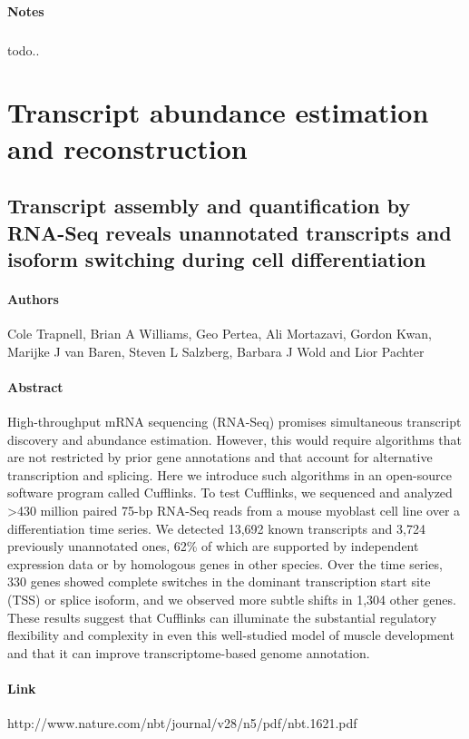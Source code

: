\documentclass{article}
\begin{document}
			\paragraph{Notes}
				\subparagraph{} todo..
	\section{Transcript abundance estimation and reconstruction}
		\subsection{Transcript assembly and quantification by RNA-Seq reveals unannotated transcripts and isoform switching during cell differentiation}
		\paragraph{Authors\\} Cole Trapnell, Brian A Williams, Geo Pertea, Ali Mortazavi, Gordon Kwan,	Marijke J van Baren, Steven L Salzberg,	Barbara J Wold and Lior Pachter
		\paragraph{Abstract\\} High-throughput mRNA sequencing (RNA-Seq) promises simultaneous transcript discovery and abundance estimation. However, this would require algorithms that are not restricted by prior gene annotations and that account for alternative transcription and splicing. Here we introduce such algorithms in an open-source software program called Cufflinks. To test Cufflinks, we sequenced and analyzed >430 million paired 75-bp RNA-Seq reads from a mouse myoblast cell line over a differentiation time series. We detected 13,692 known transcripts and 3,724 previously unannotated ones, 62\% of which are supported by independent expression data or by homologous genes in other species. Over the time series, 330 genes showed complete switches in the dominant transcription start site (TSS) or splice isoform, and we observed more subtle shifts in 1,304 other genes. These results suggest that Cufflinks can illuminate the substantial regulatory flexibility and complexity in even this well-studied model of muscle development and that it can improve transcriptome-based genome annotation.
		\paragraph{Link\\} http://www.nature.com/nbt/journal/v28/n5/pdf/nbt.1621.pdf
\end{document}
